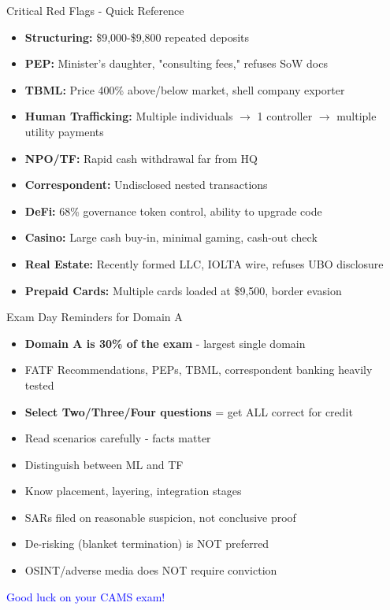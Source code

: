 \documentclass{beamer}
\begin{document}
	\begin{frame}{Critical Red Flags - Quick Reference}
		\begin{itemize}
			\item \textbf{Structuring:} \$9,000-\$9,800 repeated deposits
			\item \textbf{PEP:} Minister's daughter, "consulting fees," refuses SoW docs
			\item \textbf{TBML:} Price 400\% above/below market, shell company exporter
			\item \textbf{Human Trafficking:} Multiple individuals $\rightarrow$ 1 controller $\rightarrow$ multiple utility payments
			\item \textbf{NPO/TF:} Rapid cash withdrawal far from HQ
			\item \textbf{Correspondent:} Undisclosed nested transactions
			\item \textbf{DeFi:} 68\% governance token control, ability to upgrade code
			\item \textbf{Casino:} Large cash buy-in, minimal gaming, cash-out check
			\item \textbf{Real Estate:} Recently formed LLC, IOLTA wire, refuses UBO disclosure
			\item \textbf{Prepaid Cards:} Multiple cards loaded at \$9,500, border evasion
		\end{itemize}
	\end{frame}
	
	\begin{frame}{Exam Day Reminders for Domain A}
		\begin{itemize}
			\item \textbf{Domain A is 30\% of the exam} - largest single domain
			\item FATF Recommendations, PEPs, TBML, correspondent banking heavily tested
			\item \textbf{Select Two/Three/Four questions} = get ALL correct for credit
			\item Read scenarios carefully - facts matter
			\item Distinguish between ML and TF
			\item Know placement, layering, integration stages
			\item SARs filed on reasonable suspicion, not conclusive proof
			\item De-risking (blanket termination) is NOT preferred
			\item OSINT/adverse media does NOT require conviction
		\end{itemize}
		\vspace{0.5cm}
		\centering
		\textcolor{blue}{\Large Good luck on your CAMS exam!}
	\end{frame}
	
\end{document}
